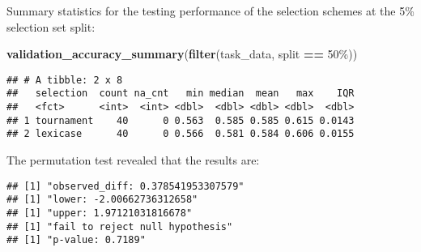 \documentclass[
]{book}
\newenvironment{Shaded}{\begin{snugshade}}{\end{snugshade}}
\newcommand{\AttributeTok}[1]{\textcolor[rgb]{0.13,0.29,0.53}{#1}}
\newcommand{\DecValTok}[1]{\textcolor[rgb]{0.00,0.00,0.81}{#1}}
\newcommand{\FunctionTok}[1]{\textcolor[rgb]{0.13,0.29,0.53}{\textbf{#1}}}
\newcommand{\NormalTok}[1]{#1}
\newcommand{\OtherTok}[1]{\textcolor[rgb]{0.56,0.35,0.01}{#1}}
\newcommand{\SpecialCharTok}[1]{\textcolor[rgb]{0.81,0.36,0.00}{\textbf{#1}}}
\newcommand{\StringTok}[1]{\textcolor[rgb]{0.31,0.60,0.02}{#1}}
\begin{document}
Summary statistics for the testing performance of the selection schemes at the 5\% selection set split:

\begin{Shaded}
\begin{Highlighting}[]
\FunctionTok{validation\_accuracy\_summary}\NormalTok{(}\FunctionTok{filter}\NormalTok{(task\_data, split }\SpecialCharTok{==} \StringTok{\textquotesingle{}50\%\textquotesingle{}}\NormalTok{))}
\end{Highlighting}
\end{Shaded}

\begin{verbatim}
## # A tibble: 2 x 8
##   selection  count na_cnt   min median  mean   max    IQR
##   <fct>      <int>  <int> <dbl>  <dbl> <dbl> <dbl>  <dbl>
## 1 tournament    40      0 0.563  0.585 0.585 0.615 0.0143
## 2 lexicase      40      0 0.566  0.581 0.584 0.606 0.0155
\end{verbatim}

The permutation test revealed that the results are:

\begin{Shaded}
\end{Shaded}

\begin{verbatim}
## [1] "observed_diff: 0.378541953307579"
## [1] "lower: -2.00662736312658"
## [1] "upper: 1.97121031816678"
## [1] "fail to reject null hypothesis"
## [1] "p-value: 0.7189"
\end{verbatim}
\end{document}
